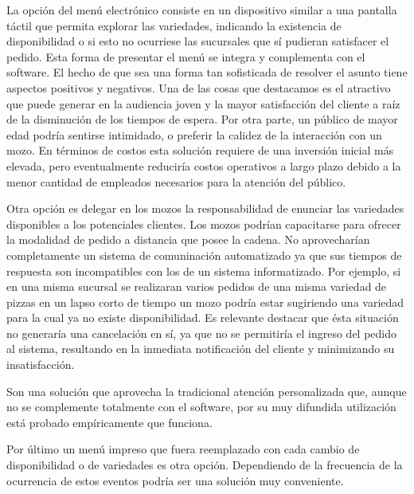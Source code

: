 \documentclass[a4paper,10pt]{article}
\begin{document}
\begin{figure}[H]
\centering
{}
\caption{}
\end{figure}

La opción del menú electrónico consiste en un dispositivo similar a una pantalla táctil que permita explorar las variedades, indicando la existencia de disponibilidad o si esto no ocurriese las sucursales que sí pudieran satisfacer el pedido. Esta forma de presentar el menú se integra y complementa con el software. El hecho de que sea una forma tan sofisticada de resolver el asunto tiene aspectos positivos y negativos. Una de las cosas que destacamos es el atractivo que puede generar en la audiencia joven y la mayor satisfacción del cliente a raíz de la disminución de los tiempos de espera. 
Por otra parte, un público de mayor edad podría sentirse intimidado, o preferir la calidez de la interacción con un mozo. En términos de costos esta solución requiere de una inversión inicial más elevada, pero eventualmente reduciría costos operativos a largo plazo debido a la menor cantidad de empleados necesarios para la atención del público. 

Otra opción es delegar en los mozos la responsabilidad de enunciar las variedades disponibles a los potenciales clientes.
Los mozos podrían capacitarse para ofrecer la modalidad de pedido a distancia que posee la cadena. No aprovecharían completamente un sistema de comuninación automatizado ya que sus tiempos de respuesta son incompatibles con los de un sistema informatizado. Por ejemplo, si en una misma sucursal se realizaran varios pedidos de una misma variedad de pizzas en un lapso corto de tiempo un mozo podría estar sugiriendo una variedad para la cual ya no existe disponibilidad. Es relevante destacar que ésta situación no generaría una cancelación en sí, ya que no se permitiría el ingreso del pedido al sistema, resultando en la inmediata notificación del cliente y minimizando su insatisfacción.

Son una solución que aprovecha la tradicional atención personalizada que, aunque no se complemente totalmente con el software, por su muy difundida utilización está probado empíricamente que funciona.

Por último un menú impreso que fuera reemplazado con cada cambio de disponibilidad o de variedades es otra opción. Dependiendo de la frecuencia de la ocurrencia de estos eventos podría ser una solución muy conveniente. 
\end{document}
